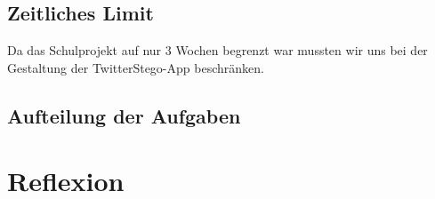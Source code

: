\documentclass[11pt]{article}
\begin{document}
\subsection{Zeitliches Limit}

Da das Schulprojekt auf nur 3 Wochen begrenzt war mussten wir uns bei der Gestaltung der TwitterStego-App beschränken. 





\subsection{Aufteilung der Aufgaben}


\newpage
\section{Reflexion}





\newpage
\renewcommand{\indexname}{Stichwortverzeichnis}


\printindex
\end{document}
